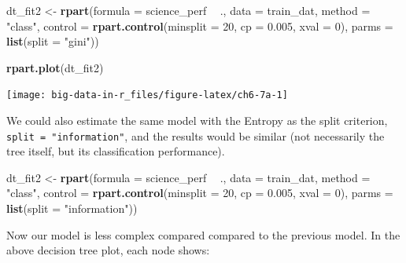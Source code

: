 \documentclass[]{book}
\newenvironment{Shaded}{\begin{snugshade}}{\end{snugshade}}
\newcommand{\DataTypeTok}[1]{\textcolor[rgb]{0.13,0.29,0.53}{#1}}
\newcommand{\DecValTok}[1]{\textcolor[rgb]{0.00,0.00,0.81}{#1}}
\newcommand{\FloatTok}[1]{\textcolor[rgb]{0.00,0.00,0.81}{#1}}
\newcommand{\KeywordTok}[1]{\textcolor[rgb]{0.13,0.29,0.53}{\textbf{#1}}}
\newcommand{\NormalTok}[1]{#1}
\newcommand{\OperatorTok}[1]{\textcolor[rgb]{0.81,0.36,0.00}{\textbf{#1}}}
\newcommand{\StringTok}[1]{\textcolor[rgb]{0.31,0.60,0.02}{#1}}
\begin{document}
\begin{Shaded}
\begin{Highlighting}[]
\NormalTok{dt_fit2 <-}\StringTok{ }\KeywordTok{rpart}\NormalTok{(}\DataTypeTok{formula =}\NormalTok{ science_perf }\OperatorTok{~}\StringTok{ }\NormalTok{.,}
                 \DataTypeTok{data =}\NormalTok{ train_dat,}
                 \DataTypeTok{method =} \StringTok{"class"}\NormalTok{, }
                 \DataTypeTok{control =} \KeywordTok{rpart.control}\NormalTok{(}\DataTypeTok{minsplit =} \DecValTok{20}\NormalTok{, }
                                         \DataTypeTok{cp =} \FloatTok{0.005}\NormalTok{, }
                                         \DataTypeTok{xval =} \DecValTok{0}\NormalTok{),}
                \DataTypeTok{parms =} \KeywordTok{list}\NormalTok{(}\DataTypeTok{split =} \StringTok{"gini"}\NormalTok{))}

\KeywordTok{rpart.plot}\NormalTok{(dt_fit2)}
\end{Highlighting}
\end{Shaded}

\texttt{[image: big-data-in-r\_files/figure-latex/ch6-7a-1]}

We could also estimate the same model with the Entropy as the split criterion, \texttt{split\ =\ "information"}, and the results would be similar (not necessarily the tree itself, but its classification performance).

\begin{Shaded}
\begin{Highlighting}[]
\NormalTok{dt_fit2 <-}\StringTok{ }\KeywordTok{rpart}\NormalTok{(}\DataTypeTok{formula =}\NormalTok{ science_perf }\OperatorTok{~}\StringTok{ }\NormalTok{.,}
                 \DataTypeTok{data =}\NormalTok{ train_dat,}
                 \DataTypeTok{method =} \StringTok{"class"}\NormalTok{, }
                 \DataTypeTok{control =} \KeywordTok{rpart.control}\NormalTok{(}\DataTypeTok{minsplit =} \DecValTok{20}\NormalTok{, }
                                         \DataTypeTok{cp =} \FloatTok{0.005}\NormalTok{, }
                                         \DataTypeTok{xval =} \DecValTok{0}\NormalTok{),}
                \DataTypeTok{parms =} \KeywordTok{list}\NormalTok{(}\DataTypeTok{split =} \StringTok{"information"}\NormalTok{))}
\end{Highlighting}
\end{Shaded}

Now our model is less complex compared compared to the previous model. In the above decision tree plot, each node shows:
\end{document}
